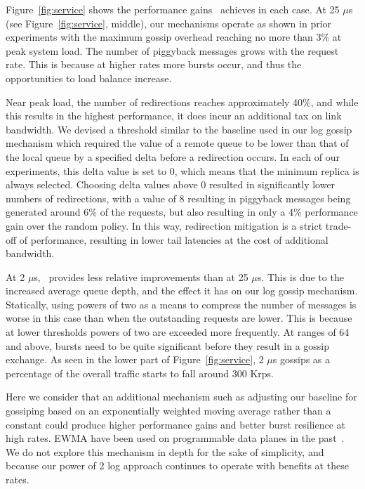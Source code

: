 Figure~\ref{fig:service} shows the performance gains \toolname\ achieves in
each case. At 25 $\mu$s (see Figure~\ref{fig:service}, middle), our mechanisms
operate as shown in prior experiments with the maximum gossip overhead reaching
no more than 3\% at peak system load. The number of piggyback messages grows
with the request rate. This is because at higher rates more bursts occur, and
thus the opportunities to load balance increase.

Near peak load, the number of redirections reaches approximately 40\%, and
while this results in the highest performance, it does incur an additional tax
on link bandwidth. We devised a threshold similar to the baseline used in our
log gossip mechanism which required the value of a remote queue to be lower
than that of the local queue by a specified delta before a redirection occurs.
In each of our experiments, this delta value is set to 0, which means that the
minimum replica is always selected. Choosing delta values above 0 resulted in
significantly lower numbers of redirections, with a value of 8 resulting in
piggyback messages being generated around 6\% of the requests, but also
resulting in only a 4\% performance gain over the random policy. In this way,
redirection mitigation is a strict trade-off of performance, resulting in lower
tail latencies at the cost of additional bandwidth.

At 2 $\mu$s, \toolname\ provides less relative improvements than at 25 $\mu$s.
This is due to the increased average queue depth, and the effect it has on our
log gossip mechanism.  Statically, using powers of two as a means to compress
the number of messages is worse in this case than when the outstanding requests
are lower. This is because at lower thresholds powers of two are exceeded more
frequently. At ranges of 64 and above, bursts need to be quite significant
before they result in a gossip exchange.  As seen in the lower part of
Figure~\ref{fig:service}, 2 $\mu$s gossips as a percentage of the overall
traffic starts to fall around 300 Krps.

Here we consider that an additional mechanism such as adjusting our baseline
for gossiping based on an exponentially weighted moving average rather than a
constant could produce higher performance gains and better burst resilience at
high rates. EWMA have been used on programmable data planes in the
past~\cite{adaptive_planes}. We do not explore this mechanism in depth for the
sake of simplicity, and because our power of 2 log approach continues to
operate with benefits at these rates.

